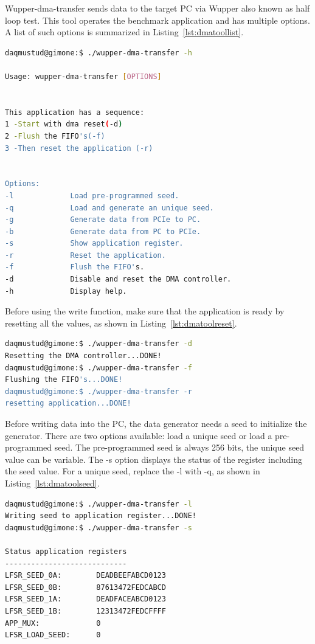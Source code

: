 Wupper-dma-transfer sends data to the target PC via Wupper also known as half loop test. This tool operates the benchmark application and has multiple options. A list of such options is summarized in Listing~\ref{lst:dmatoollist}.

\begin{lstlisting}[language=BASH, frame=single, label={lst:dmatoollist}, caption=Output of Wupper-dma-transfer -h]
daqmustud@gimone:$ ./wupper-dma-transfer -h

Usage: wupper-dma-transfer [OPTIONS]


This application has a sequence: 
1 -Start with dma reset(-d)
2 -Flush the FIFO's(-f)
3 -Then reset the application (-r)


Options:
-l             Load pre-programmed seed.
-q             Load and generate an unique seed.
-g             Generate data from PCIe to PC.
-b             Generate data from PC to PCIe.
-s             Show application register.
-r             Reset the application.
-f             Flush the FIFO's.
-d             Disable and reset the DMA controller.
-h             Display help.


\end{lstlisting}


 Before using the write function, make sure that the application is ready by resetting all the values, as shown in Listing~\ref{lst:dmatoolreset}.

\begin{lstlisting}[language=BASH, frame=single, label={lst:dmatoolreset},  caption=Reset Wupper before a DMA Write action]
daqmustud@gimone:$ ./wupper-dma-transfer -d
Resetting the DMA controller...DONE! 
daqmustud@gimone:$ ./wupper-dma-transfer -f
Flushing the FIFO's...DONE! 
daqmustud@gimone:$ ./wupper-dma-transfer -r
resetting application...DONE! 
\end{lstlisting}

\newpage

\noindent
Before writing data into the PC, the data generator needs a seed to initialize the generator. There are two options available: load a unique seed or load a pre-programmed seed. The pre-programmed seed is always 256 bits, the unique seed value can be variable. The -s option displays the status of the register including the seed value. For a unique seed, replace the -l with -q, as shown in Listing~\ref{lst:dmatoolseed}.

\begin{lstlisting}[language=BASH, frame=single, label={lst:dmatoolseed}, caption=Loading a pre-programmed seed in to the data generator.]
daqmustud@gimone:$ ./wupper-dma-transfer -l
Writing seed to application register...DONE! 
daqmustud@gimone:$ ./wupper-dma-transfer -s

Status application registers
----------------------------
LFSR_SEED_0A:        DEADBEEFABCD0123 
LFSR_SEED_0B:        87613472FEDCABCD 
LFSR_SEED_1A:        DEADFACEABCD0123 
LFSR_SEED_1B:        12313472FEDCFFFF 
APP_MUX:             0 
LFSR_LOAD_SEED:      0
\end{lstlisting}


